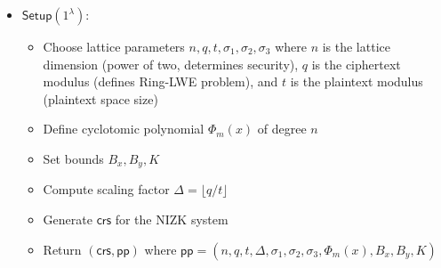 \begin{itemize}
\item $\mathsf{Setup}(1^\lambda)$:
   \begin{itemize}
       \item Choose lattice parameters $n, q, t, \sigma_1, \sigma_2, \sigma_3$ where $n$ is the lattice dimension (power of two, determines security), $q$ is the ciphertext modulus (defines Ring-LWE problem), and $t$ is the plaintext modulus (plaintext space size)
       \item Define cyclotomic polynomial $\Phi_m(x)$ of degree $n$
       \item Set bounds $B_x, B_y, K$
       \item Compute scaling factor $\Delta = \lfloor q/t \rfloor$
       \item Generate $\mathsf{crs}$ for the NIZK system
       \item Return $(\mathsf{crs}, \mathsf{pp})$ where $\mathsf{pp} = (n, q, t, \Delta, \sigma_1, \sigma_2, \sigma_3, \Phi_m(x), B_x, B_y, K)$
   \end{itemize}
   

\end{itemize}
